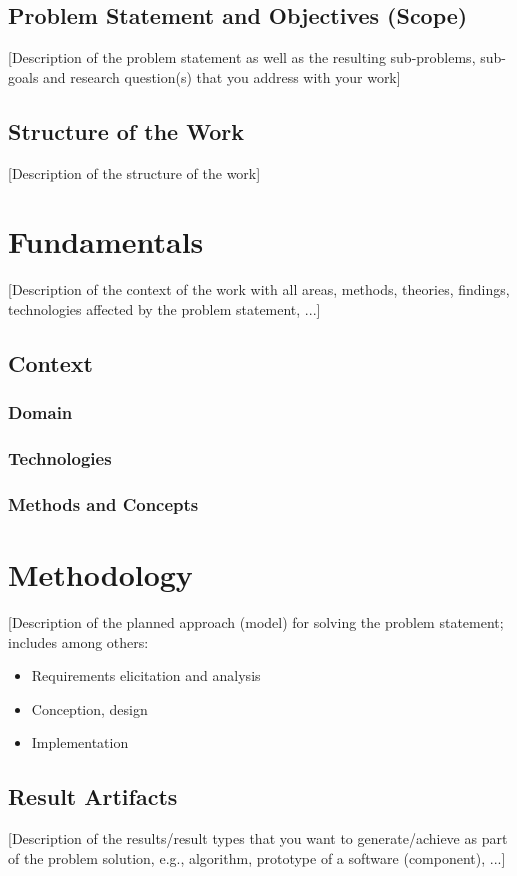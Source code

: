 \documentclass[oneside,bibliography=totocnumbered,BCOR=5mm]{scrbook}
\begin{document}
\section{Problem Statement and Objectives (Scope)}
[Description of the problem statement as well as the resulting sub-problems, sub-goals and research question(s) that you address with your work]

\section{Structure of the Work}
[Description of the structure of the work]

\chapter{Fundamentals}
[Description of the context of the work with all areas, methods, theories, findings, technologies affected by the problem statement, ...]

\section{Context}

\subsection{Domain}

\subsection{Technologies}

\subsection{Methods and Concepts}

\chapter{Methodology}
[Description of the planned approach (model) for solving the problem statement; includes among others:
\begin{itemize}
\item Requirements elicitation and analysis
\item Conception, design
\item Implementation
\end{itemize}

\section{Result Artifacts}
[Description of the results/result types that you want to generate/achieve as part of the problem solution, e.g., algorithm, prototype of a software (component), ...]
\end{document}
